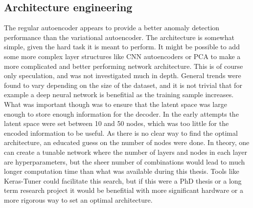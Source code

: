 \subsection*{Architecture engineering}
The regular autoencoder appears to provide a better anomaly detection performance than the variational autoencoder. 
The architecture is somewhat simple, given the hard task it is meant to perform. It might be possible to 
add some more complex layer structures like CNN autoencoders or PCA to make a more complicated and better performing 
network architecture. This is of course only speculation, and was not investigated much in depth. General trends were 
found to vary depending on the size of the dataset, and it is not trivial that for example a deep neural network is 
benefitial as the training sample increases. What was important though was to ensure that the latent space was large 
enough to store enough information for the decoder. In the early attempts the latent space were set between 10 and 50 
nodes, which was too little for the encoded information to be useful. As there is no clear way to find the optimal 
architecture, an educated guess on the number of nodes were done. In theory, one can create a tunable network where 
the number of layers and nodes in each layer are hyperparameters, but the sheer number of combinations would lead to 
much longer computation time than what was available during this thesis. Tools like Keras-Tuner could facilitate 
this search, but if this were a PhD thesis or a long term research project it would be benefitial with more
 significant hardware or a more rigorous way to set an optimal architecture. \par


